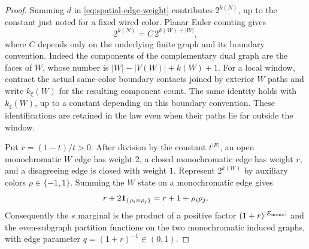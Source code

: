 \begin{proof}
Summing $d$ in \eqref{eq:spatial-edge-weight} contributes $2^{k(N)}$,
up to the constant just noted for a fixed wired color. Planar Euler
counting gives
\begin{equation}\label{eq:spatial-euler}
       2^{k(N)}=C\,2^{k(W)+|W|},
\end{equation}
where $C$ depends only on the underlying finite graph and its boundary
convention. Indeed the components of the complementary dual graph are
the faces of $W$, whose number is $|W|-|V(W)|+k(W)+1$.
For a local window, contract the actual same-color boundary contacts
joined by exterior $W$ paths and write $k_\xi(W)$ for the resulting
component count. The same identity holds with $k_\xi(W)$, up to a
constant depending on this boundary convention. These identifications
are retained in the law even when their paths lie far outside the window.

Put $r=(1-t)/t>0$. After division by the constant $t^{|E|}$, an open
monochromatic $W$ edge has weight $2$, a closed monochromatic edge has
weight $r$, and a disagreeing edge is closed with weight $1$.
Represent $2^{k(W)}$ by auxiliary colors $\rho\in\{-1,1\}$.
Summing the $W$ state on a monochromatic edge gives
\begin{equation}\label{eq:spatial-ferro-factor}
 r+2\mathbf 1_{\{\rho_i=\rho_j\}}
       =r+1+\rho_i\rho_j.
\end{equation}
Consequently the $s$ marginal is the product of a positive factor
$(1+r)^{|E_{\rm mono}|}$ and the even-subgraph partition functions on
the two monochromatic induced graphs, with edge parameter
$q=(1+r)^{-1}\in(0,1)$.


\end{proof}

